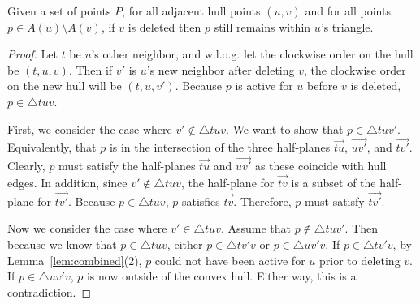 \documentclass{cccg24}
\newcommand{\Tri}[3]{\triangle #1#2#3}
\newcommand{\hp}[1]{\overrightarrow{#1}}
\begin{document}
\begin{lemma}\label{lem:still-in-triangle}
    Given a set of points $P$, for all adjacent hull points $(u, v)$ and for all points $p \in A(u) \setminus A(v)$, if $v$ is deleted then $p$ still remains within $u$'s triangle.
\end{lemma}
\begin{proof}
    Let $t$ be $u$'s other neighbor, and w.l.o.g. let the clockwise order on the hull be $(t, u, v)$. Then if $v'$ is $u$'s new neighbor after deleting $v$, the clockwise order on the new hull will be $(t, u, v')$. Because $p$ is active for $u$ before $v$ is deleted, $p \in \Tri tuv$.
    
    First, we consider the case where $v' \notin \Tri{t}{u}{v}$. We want to show that $p \in \Tri{t}{u}{v'}$. Equivalently, that $p$ is in the intersection of the three half-planes $\hp{tu}$, $\hp{uv'}$, and $\hp{tv'}$. Clearly, $p$ must satisfy the half-planes $\hp{tu}$ and $\hp{uv'}$ as these coincide with hull edges. In addition, since $v' \notin \Tri tuv$, the half-plane for $\hp{tv}$ is a subset of the half-plane for $\hp{tv'}$. Because $p \in \Tri tuv$, $p$ satisfies $\hp{tv}$. Therefore, $p$ must satisfy $\hp{tv'}$. 

    Now we consider the case where $v' \in \Tri tuv$. Assume that $p \notin \Tri tu{v'}$. Then because we know that $p \in \Tri tuv$, either $p \in \Tri t{v'}v$ or $p \in \Tri u{v'}v$. If $p \in \Tri t{v'}v$, by Lemma~\ref{lem:combined}(2), $p$ could not have been active for $u$ prior to deleting $v$. If $p \in \Tri u{v'}v$, $p$ is now outside of the convex hull. Either way, this is a contradiction.


    

\end{proof}
\end{document}
